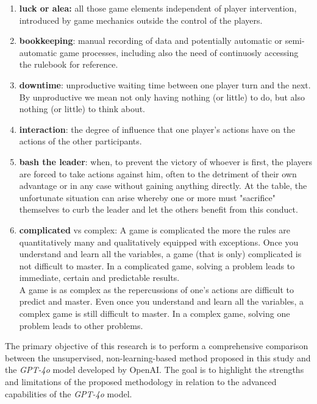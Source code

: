 \documentclass[sn-mathphys-num]{sn-jnl}%
\theoremstyle{thmstyleone}%
\theoremstyle{thmstyletwo}%
\theoremstyle{thmstylethree}%
\begin{document}
    \begin{enumerate}
        \item \textbf{luck or alea:} all those game elements independent of player intervention, introduced by game mechanics outside the control of the players.
        \item \textbf{bookkeeping}: manual recording of data and potentially automatic or semi-automatic game processes, including also the need of continuosly accessing the rulebook for reference.
        \item \textbf{downtime}: unproductive waiting time between one player turn and the next. By unproductive we mean not only having nothing (or little) to do, but also nothing (or little) to think about.
        \item \textbf{interaction}: the degree of influence that one player's actions have on the actions of the other participants.
        \item \textbf{bash the leader}: when, to prevent the victory of whoever is first, the players are forced to take actions against him, often to the detriment of their own advantage or in any case without gaining anything directly. At the table, the unfortunate situation can arise whereby one or more must "sacrifice" themselves to curb the leader and let the others benefit from this conduct.
        \item \textbf{complicated} vs complex: A game is complicated the more the rules are quantitatively many and qualitatively equipped with exceptions. Once you understand and learn all the variables, a game (that is only) complicated is not difficult to master. In a complicated game, solving a problem leads to immediate, certain and predictable results.\\A game is as complex as the repercussions of one's actions are difficult to predict and master. Even once you understand and learn all the variables, a complex game is still difficult to master. In a complex game, solving one problem leads to other problems.
    \end{enumerate}
    The primary objective of this research is to perform a comprehensive comparison between the unsupervised, non-learning-based method proposed in this study and the \textit{GPT-4o} model developed by OpenAI. The goal is to highlight the strengths and limitations of the proposed methodology in relation to the advanced capabilities of the \textit{GPT-4o} model.
\end{document}
